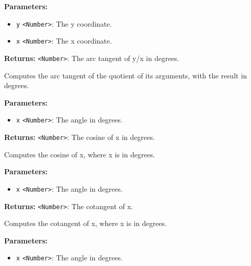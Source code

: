 \documentclass[12pt,a4paper]{article}
\begin{document}
\noindent \textbf{Parameters:}
\begin{itemize}
  \item \texttt{y} \texttt{<Number>}: The y coordinate.
  \item \texttt{x} \texttt{<Number>}: The x coordinate.
\end{itemize}

\noindent \textbf{Returns:} \texttt{<Number>}: The arc tangent of y/x in degrees.

\noindent Computes the arc tangent of the quotient of its arguments, with the result in degrees.

\vspace{5mm}
\noindent {}


\noindent \textbf{Parameters:}
\begin{itemize}
  \item \texttt{x} \texttt{<Number>}: The angle in degrees.
\end{itemize}

\noindent \textbf{Returns:} \texttt{<Number>}: The cosine of x in degrees.

\noindent Computes the cosine of x, where x is in degrees.

\vspace{5mm}
\noindent {}


\noindent \textbf{Parameters:}
\begin{itemize}
  \item \texttt{x} \texttt{<Number>}: The angle in degrees.
\end{itemize}

\noindent \textbf{Returns:} \texttt{<Number>}: The cotangent of x.

\noindent Computes the cotangent of x, where x is in degrees.

\vspace{5mm}
\noindent {}


\noindent \textbf{Parameters:}
\begin{itemize}
  \item \texttt{x} \texttt{<Number>}: The angle in degrees.
\end{itemize}
\end{document}
